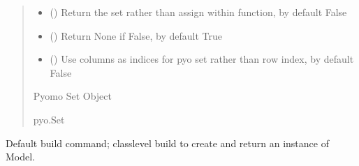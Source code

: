 \documentclass[letterpaper,10pt,english]{sphinxmanual}
\begin{document}
\begin{fulllineitems}
\begin{fulllineitems}
\begin{quote}
\begin{description}
\begin{itemize}
\item {} 
\sphinxAtStartPar
{} (\sphinxstyleliteralemphasis{\sphinxupquote{ | }}\sphinxstyleliteralemphasis{\sphinxupquote{, }}) \textendash{} Return the set rather than assign within function, by default False

\item {} 
\sphinxAtStartPar
{} (\sphinxstyleliteralemphasis{\sphinxupquote{ | }}\sphinxstyleliteralemphasis{\sphinxupquote{, }}) \textendash{} Return None if False, by default True

\item {} 
\sphinxAtStartPar
{} (\sphinxstyleliteralemphasis{\sphinxupquote{ | }}\sphinxstyleliteralemphasis{\sphinxupquote{, }}) \textendash{} Use columns as indices for pyo set rather than row index, by default False

\end{itemize}

\sphinxAtStartPar
Pyomo Set Object

\sphinxAtStartPar
pyo.Set

\end{description}\end{quote}

\end{fulllineitems}


\begin{fulllineitems}
\label{\detokenize{src.common.model:src.common.model.Model.build}}
\pysigstartsignatures
\pysiglinewithargsret
{}
{}
{}
\pysigstopsignatures
\sphinxAtStartPar
Default build command; class\sphinxhyphen{}level build to create and return an instance of Model.


\end{fulllineitems}
\end{fulllineitems}
\end{document}
